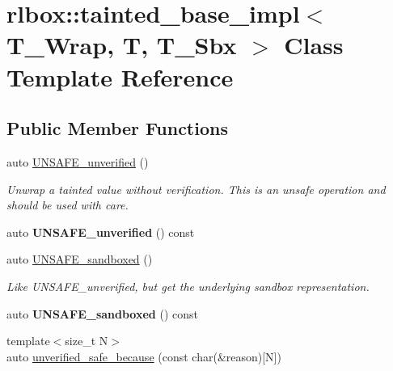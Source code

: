 \hypertarget{classrlbox_1_1tainted__base__impl}{}\section{rlbox\+:\+:tainted\+\_\+base\+\_\+impl$<$ T\+\_\+\+Wrap, T, T\+\_\+\+Sbx $>$ Class Template Reference}
\label{classrlbox_1_1tainted__base__impl}
\subsection*{Public Member Functions}
\begin{DoxyCompactItemize}
\item 
\mbox{\label{classrlbox_1_1tainted__base__impl_a01acab6b4bd8137afa03cf4b2678844f}} 
auto \hyperlink{classrlbox_1_1tainted__base__impl_a01acab6b4bd8137afa03cf4b2678844f}{U\+N\+S\+A\+F\+E\+\_\+unverified} ()
\begin{DoxyCompactList}\small\item\em Unwrap a tainted value without verification. This is an unsafe operation and should be used with care. \end{DoxyCompactList}\item 
\mbox{\label{classrlbox_1_1tainted__base__impl_a41f8eed43072bf173cce34cd3351191e}} 
auto {\bfseries U\+N\+S\+A\+F\+E\+\_\+unverified} () const
\item 
auto \hyperlink{classrlbox_1_1tainted__base__impl_adb4270e907768562120dc32cf955424e}{U\+N\+S\+A\+F\+E\+\_\+sandboxed} ()
\begin{DoxyCompactList}\small\item\em Like U\+N\+S\+A\+F\+E\+\_\+unverified, but get the underlying sandbox representation. \end{DoxyCompactList}\item 
\mbox{\label{classrlbox_1_1tainted__base__impl_a4ce9db12dd3745b6fd7b3e52e41ef3f2}} 
auto {\bfseries U\+N\+S\+A\+F\+E\+\_\+sandboxed} () const
\item 
{\footnotesize template$<$size\+\_\+t N$>$ }\\auto \hyperlink{classrlbox_1_1tainted__base__impl_a1292132a467d30150be6d4e2b72ff6b2}{unverified\+\_\+safe\+\_\+because} (const char(\&reason)\mbox{[}N\mbox{]})

\end{DoxyCompactItemize}
